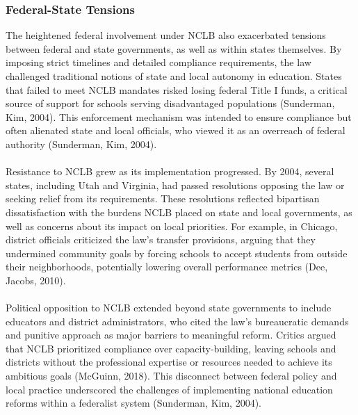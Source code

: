 \documentclass[11pt]{extarticle}
\begin{document}
\subsubsection{Federal-State Tensions}
The heightened federal involvement under NCLB also exacerbated tensions between federal and state governments, as well as within states themselves. By imposing strict timelines and detailed compliance requirements, the law challenged traditional notions of state and local autonomy in education. States that failed to meet NCLB mandates risked losing federal Title I funds, a critical source of support for schools serving disadvantaged populations (Sunderman, Kim, 2004). 
This enforcement mechanism was intended to ensure compliance but often alienated state and local officials, who viewed it as an overreach of federal authority (Sunderman, Kim, 2004).\\
\\
Resistance to NCLB grew as its implementation progressed. By 2004, several states, including Utah and Virginia, had passed resolutions opposing the law or seeking relief from its requirements. These resolutions reflected bipartisan dissatisfaction with the burdens NCLB placed on state and local governments, as well as concerns about its impact on local priorities. For example, in Chicago, district officials criticized the law’s transfer provisions, arguing that they undermined community goals by forcing schools to accept students from outside their neighborhoods, potentially lowering overall performance metrics (Dee, Jacobs, 2010).\\
\\
Political opposition to NCLB extended beyond state governments to include educators and district administrators, who cited the law’s bureaucratic demands and punitive approach as major barriers to meaningful reform. Critics argued that NCLB prioritized compliance over capacity-building, leaving schools and districts without the professional expertise or resources needed to achieve its ambitious goals (McGuinn, 2018). This disconnect between federal policy and local practice underscored the challenges of implementing national education reforms within a federalist system (Sunderman, Kim, 2004).
\end{document}
